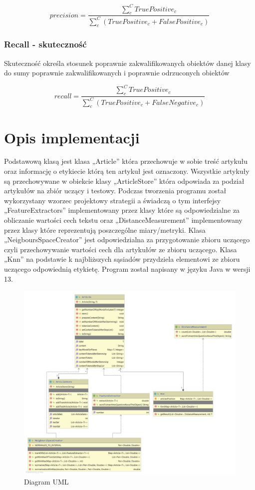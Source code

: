 \documentclass{classrep}
\begin{document}
\begin{equation}
precision = \frac{\sum_{c}^C{True Positive_c}}{\sum_{c}^C({True Positive_c + False Positive_c})}
\end{equation}

\subsubsection{Recall - skuteczność}
Skuteczność określa stosunek poprawnie zakwalifikowanych obiektów danej klasy do sumy poprawnie zakwalifikowanych i poprawnie odrzuconych obiektów 

\begin{equation}
recall = \frac{\sum_{c}^C{True Positive_c}}{\sum_{c}^C({True Positive_c + False Negative_c})}
\end{equation}


\section{Opis implementacji}
{
Podstawową klasą jest klasa „Article” która przechowuje w sobie treść artykułu oraz informację o etykiecie którą ten artykuł jest oznaczony. Wszystkie artykuły są przechowywane w obiekcie klasy „ArticleStore” która odpowiada za podział artykułów na zbiór uczący i testowy. Podczas tworzenia programu został wykorzystany wzorzec projektowy strategii a świadczą o tym interfejsy „FeatureExtractors” implementowany przez klasy które są odpowiedzialne za obliczanie wartości cech tekstu oraz „DistanceMeasurement” implementowany przez klasy które reprezentują poszczególne miary/metryki. Klasa „NeigboursSpaceCreator” jest odpowiedzialna za przygotowanie zbioru uczącego czyli przechowywanie wartości cech dla artykułów ze zbioru uczącego. Klasa „Knn” na podstawie k najbliższych sąsiadów przydziela elementowi ze zbioru uczącego odpowiednią etykietę.
Program został napisany w języku Java w wersji 13.

\begin{figure}[H]
\caption{Diagram UML}
\centering
\includegraphics[width=1\textwidth]{uml}
\end{figure}
 }
\end{document}
